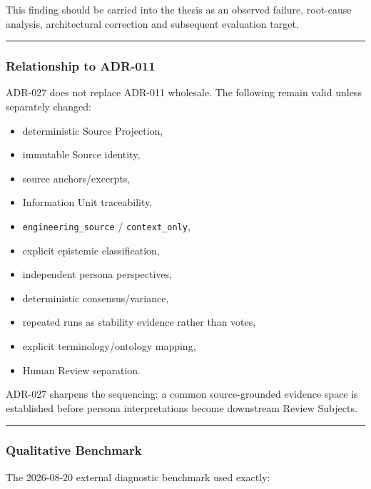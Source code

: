 This finding should be carried into the thesis as an observed failure, root-cause analysis, architectural correction and subsequent evaluation target.

\begin{center}\rule{0.5\linewidth}{0.5pt}\end{center}

\hypertarget{relationship-to-adr-011}{%
\subsubsection{Relationship to ADR-011}\label{relationship-to-adr-011}}

ADR-027 does not replace ADR-011 wholesale. The following remain valid unless separately changed:

\begin{itemize}
\tightlist
\item
  deterministic Source Projection,
\item
  immutable Source identity,
\item
  source anchors/excerpts,
\item
  Information Unit traceability,
\item
  \texttt{engineering\_source} / \texttt{context\_only},
\item
  explicit epistemic classification,
\item
  independent persona perspectives,
\item
  deterministic consensus/variance,
\item
  repeated runs as stability evidence rather than votes,
\item
  explicit terminology/ontology mapping,
\item
  Human Review separation.
\end{itemize}

ADR-027 sharpens the sequencing: a common source-grounded evidence space is established before persona interpretations become downstream Review Subjects.

\begin{center}\rule{0.5\linewidth}{0.5pt}\end{center}

\hypertarget{qualitative-benchmark}{%
\subsubsection{Qualitative Benchmark}\label{qualitative-benchmark}}

The 2026-08-20 external diagnostic benchmark used exactly:

